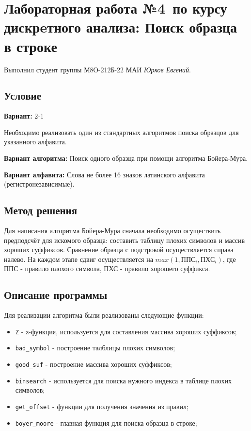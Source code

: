 \documentclass[12pt]{article}
\begin{document}
\section*{Лабораторная работа №4\, по курсу дискрeтного анализа: Поиск образца в строке}

Выполнил студент группы М8О-212Б-22 МАИ \textit{Юрков Евгений}.

\subsection*{Условие}

\textbf{Вариант:} 2-1

Необходимо реализовать один из стандартных алгоритмов поиска образцов для указанного алфавита.

\textbf{Вариант алгоритма:} Поиск одного образца при помощи алгоритма Бойера-Мура.

\textbf{Вариант алфавита:} Слова не более 16 знаков латинского алфавита (регистронезависимые).


\newpage
\subsection*{Метод решения}

Для написания алгоритма Бойера-Мура сначала необходимо осуществить предподсчёт для искомого образца: составить таблицу плохих символов
и массив хороших суффиксов. Сравнение образца с подстрокой осуществляется справа налево. На каждом этапе сдвиг осуществляется на
$max(1, ППС_i, ПХС_i)$, где ППС - правило плохого символа, ПХС - правило хорошего суффикса.

\subsection*{Описание программы}

Для реализации алгоритма были реализованы следующие функции:
\begin{itemize}
    \item \texttt{Z} - z-функция, используется для составления массива хороших суффиксов;
    \item \texttt{bad\_symbol} - построение талблицы плохих символов;
    \item \texttt{good\_suf} - построение массива хороших суффиксов;
    \item \texttt{binsearch} - используется для поиска нужного индекса в таблице плохих символов;
    \item \texttt{get\_offset} - функции для получения значения из правил;
    \item \texttt{boyer\_moore} - главная функция для поиска образца в строке;
\end{itemize}
\end{document}

